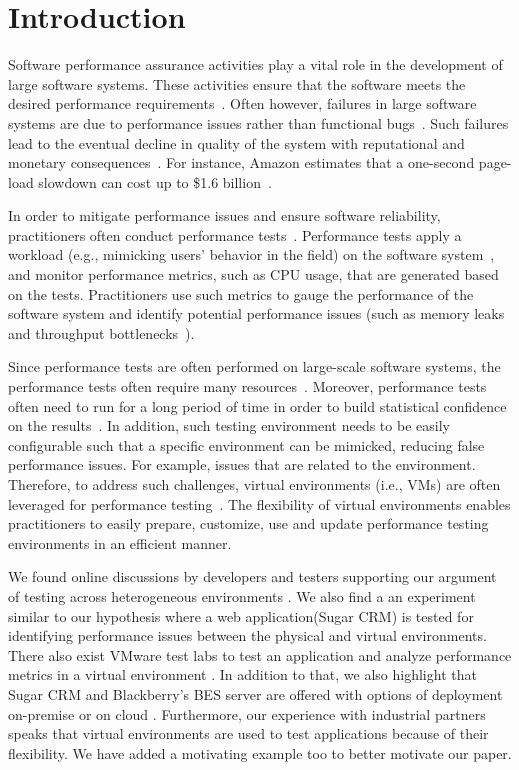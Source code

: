 \documentclass[smallextended]{svjour3}       %
\begin{document}
\section{Introduction}

Software performance assurance activities play a vital role in the development of large software systems. These activities ensure that the software meets the desired performance requirements~\cite{futureofspe}. Often however, failures in large software systems are due to performance issues rather than functional bugs~\cite{tailatscale, foo2010mining}. Such failures lead to the eventual decline in quality of the system with reputational and monetary consequences~\cite{costofdowntime}. For instance, Amazon estimates that a one-second page-load slowdown can cost up to \$1.6 billion~\cite{amazononesec}. 

In order to mitigate performance issues and ensure software reliability, practitioners often conduct performance tests~\cite{futureofspe}. Performance tests apply a workload (e.g., mimicking users' behavior in the field) on the software system~\cite{ranjanbook,Syer2016}, and monitor performance metrics, such as CPU usage, that are generated based on the tests. Practitioners use such metrics to gauge the performance of the software system and identify potential performance issues (such as memory leaks~\cite{markicsm2013} and throughput bottlenecks~\cite{5635038}).

Since performance tests are often performed on large-scale software systems, the performance tests often require many resources~\cite{ranjanbook}. Moreover, performance tests often need to run for a long period of time in order to build statistical confidence on the results~\cite{ranjanbook}. In addition, such testing environment needs to be easily configurable such that a specific environment can be mimicked, reducing false performance issues. For example, issues that are related to the environment. Therefore, to address such challenges, virtual environments (i.e., VMs) are often leveraged for performance testing~\cite{whyvirtualisbetter, vmwarehighcost, whyvirtualisbetter}. The flexibility of virtual environments enables practitioners to easily prepare, customize, use and update performance testing environments in an efficient manner.


We found online discussions by developers and testers supporting our argument of testing across heterogeneous environments \cite{performanceonvvirtual}\cite{stackoverflow}\cite{windowsserver}. We also find a an experiment similar to our hypothesis where a web application(Sugar CRM) is tested for identifying performance issues between the physical and virtual environments\cite{sugarcrmexp}. There also exist VMware test labs to test an application and analyze performance metrics in a virtual environment \cite{vmware_test_lab}. In addition to that, we also highlight that Sugar CRM and Blackberry's BES server are offered with options of deployment on-premise or on cloud \cite{bbs} \cite{sugarcrm}. Furthermore, our experience with industrial partners speaks that virtual environments are used to test applications because of their flexibility. We have added a motivating example too to better motivate our paper.
\end{document}
